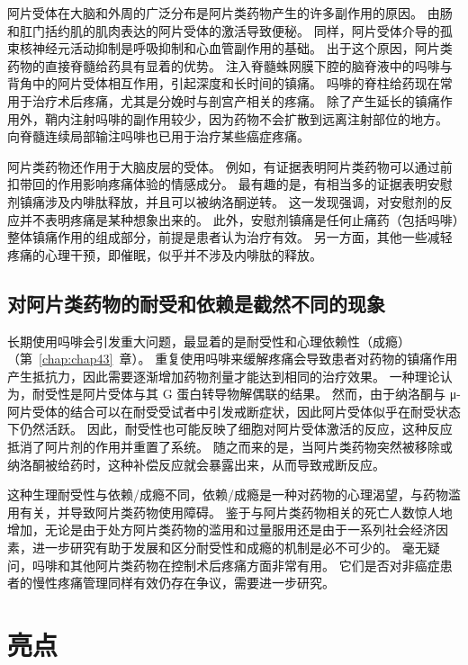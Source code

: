 阿片受体在大脑和外周的广泛分布是阿片类药物产生的许多副作用的原因。
由肠和肛门括约肌的肌肉表达的阿片受体的激活导致便秘。
同样，阿片受体介导的孤束核神经元活动抑制是呼吸抑制和心血管副作用的基础。
出于这个原因，阿片类药物的直接脊髓给药具有显着的优势。
注入脊髓蛛网膜下腔的脑脊液中的吗啡与背角中的阿片受体相互作用，引起深度和长时间的镇痛。
吗啡的脊柱给药现在常用于治疗术后疼痛，尤其是分娩时与剖宫产相关的疼痛。
除了产生延长的镇痛作用外，鞘内注射吗啡的副作用较少，因为药物不会扩散到远离注射部位的地方。
向脊髓连续局部输注吗啡也已用于治疗某些癌症疼痛。


阿片类药物还作用于大脑皮层的受体。
例如，有证据表明阿片类药物可以通过前扣带回的作用影响疼痛体验的情感成分。
最有趣的是，有相当多的证据表明安慰剂镇痛涉及内啡肽释放，并且可以被纳洛酮逆转。
这一发现强调，对安慰剂的反应并不表明疼痛是某种想象出来的。
此外，安慰剂镇痛是任何止痛药（包括吗啡）整体镇痛作用的组成部分，前提是患者认为治疗有效。
另一方面，其他一些减轻疼痛的心理干预，即催眠，似乎并不涉及内啡肽的释放。



\subsection{对阿片类药物的耐受和依赖是截然不同的现象}

长期使用吗啡会引发重大问题，最显着的是耐受性和心理依赖性（成瘾）（第~\ref{chap:chap43}~章）。
重复使用吗啡来缓解疼痛会导致患者对药物的镇痛作用产生抵抗力，因此需要逐渐增加药物剂量才能达到相同的治疗效果。
一种理论认为，耐受性是阿片受体与其 G 蛋白转导物解偶联的结果。
然而，由于纳洛酮与 μ-阿片受体的结合可以在耐受受试者中引发戒断症状，因此阿片受体似乎在耐受状态下仍然活跃。
因此，耐受性也可能反映了细胞对阿片受体激活的反应，这种反应抵消了阿片剂的作用并重置了系统。
随之而来的是，当阿片类药物突然被移除或纳洛酮被给药时，这种补偿反应就会暴露出来，从而导致戒断反应。


这种生理耐受性与依赖/成瘾不同，依赖/成瘾是一种对药物的心理渴望，与药物滥用有关，并导致阿片类药物使用障碍。
鉴于与阿片类药物相关的死亡人数惊人地增加，无论是由于处方阿片类药物的滥用和过量服用还是由于一系列社会经济因素，进一步研究有助于发展和区分耐受性和成瘾的机制是必不可少的。
毫无疑问，吗啡和其他阿片类药物在控制术后疼痛方面非常有用。
它们是否对非癌症患者的慢性疼痛管理同样有效仍存在争议，需要进一步研究。



\section{亮点}


